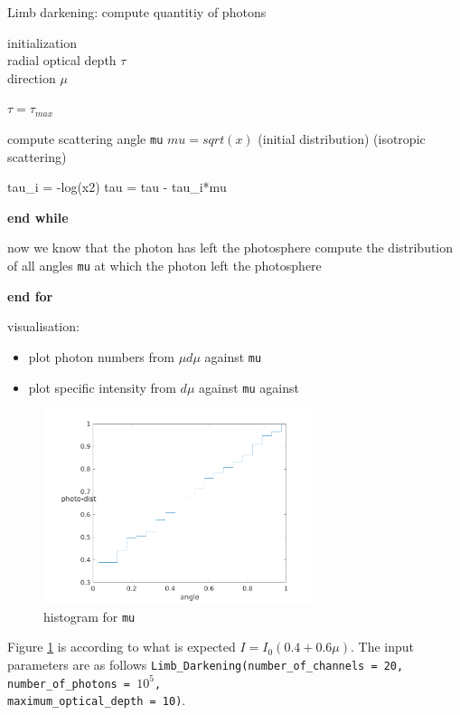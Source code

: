 \documentclass[../main/main.tex]{subfiles}
\begin{document}
\begin{algorithm}
\caption{Limb darkening: compute quantitiy of photons}\label{limb_darkening}
\begin{algorithmic}
\State initialization \\
\quad radial optical depth $\tau$ \\
\quad direction $\mu$


\State $\boxed{\tau = \tau_{max}}$
	
	\State compute scattering angle \texttt{mu}
	 $\boxed{mu = sqrt(x)}$ (initial distribution)
	 (isotropic scattering)
	\EndIf
	
	\State tau\_i = -log(x2) 
	\State tau = tau - tau\_i*mu	
		
	\EndWhile
	\State \textbf{end while}

	\State now we know that the photon has left the photosphere	
	\State compute the distribution of all angles \texttt{mu} at which the photon left the photosphere
	
\EndFor
\State \textbf{end for}

\State visualisation: 
	\begin{itemize}
	\item plot photon numbers from $\mu d\mu$ against \texttt{mu}
	\item plot specific intensity from $d\mu$ against \texttt{mu} against 
	\end{itemize}


\end{algorithmic}
\end{algorithm}


\begin{figure}[!htp]
\centering
\includegraphics[width=0.7\textwidth]{../../introductory_exercises/limb_darkening/data/number_channels20number_photons100000max_opt_depth10.png}
\caption{histogram for \texttt{mu}}
\label{2D_mu}
\end{figure}
Figure \ref{2D_mu} is according to what is expected $I = I_0(0.4+0.6\mu)$. The input parameters are as follows \texttt{Limb\_Darkening(number\_of\_channels = 20, number\_of\_photons = $10^5$, \\ maximum\_optical\_depth = 10)}.
\end{document}
